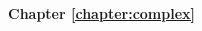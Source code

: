%
%
\small

\begin{adjustwidth}{-70pt}{-70pt}
\raggedright
\begin{multicols}{3}

%
%
{\Large \bf Chapter \ref{chapter:complex}}\\
%
%

%
%
%
%
%
%
%
%
%
%
%
%
%
%


\end{multicols}
\end{adjustwidth}
\normalsize